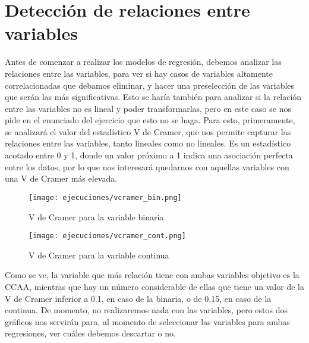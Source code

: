 \documentclass[a4paper,onecolumn]{extarticle}
\let\stdsection\section
\renewcommand\section{\newpage\stdsection}
\begin{document}
\begin{sloppypar}
\section{Detección de relaciones entre variables}\label{relaciones}
Antes de comenzar a realizar los modelos de regresión, debemos analizar las relaciones entre las variables, para ver si hay casos de variables altamente 
correlacionadas que debamos eliminar, y hacer una preselección de las variables que serán las más significativas. Esto se haría también para analizar si la 
relación entre las variables no es lineal y poder transformarlas, pero en este caso se nos pide en el enunciado del ejercicio que esto no se haga. Para esto,
primeramente, se analizará el valor del estadístico V de Cramer, que nos permite capturar las relaciones entre las variables, tanto lineales como no lineales. 
Es un estadístico acotado entre 0 y 1, donde un valor próximo a 1 indica una asociación perfecta entre los datos, por lo que nos interesará quedarnos con aquellas 
variables con una V de Cramer más elevada.
\begin{figure}[h!]
    \centering
    \begin{minipage}{0.5\textwidth}
        \centering
        \texttt{[image: ejecuciones/vcramer\_bin.png]}
        \caption{V de Cramer para la variable binaria}
        \label{fig:cramerbin}
    \end{minipage}%
    \begin{minipage}{0.5\textwidth}
        \centering
        \texttt{[image: ejecuciones/vcramer\_cont.png]}
        \caption{V de Cramer para la variable continua}
        \label{fig:cramercont}
    \end{minipage}
\end{figure}

Como se ve, la variable que más relación tiene con ambas variables objetivo es la CCAA, mientras que hay un número considerable de ellas que tiene un valor de 
la V de Cramer inferior a 0.1, en caso de la binaria, o de 0.15, en caso de la continua. De momento, no realizaremos nada con las variables, pero estos dos 
gráficos nos servirán para, al momento de seleccionar las variables para ambas regresiones, ver cuáles debemos descartar o no.


\end{sloppypar}
\end{document}
